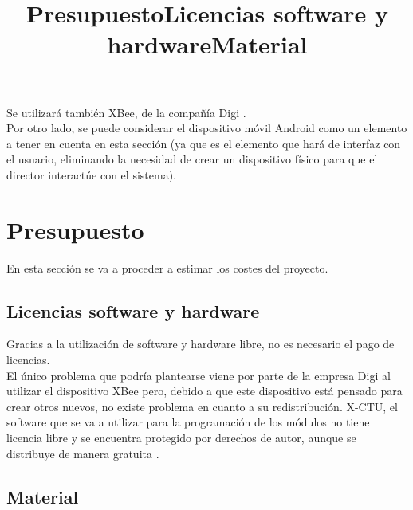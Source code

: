 Se utilizará también XBee, de la compañía Digi \cite{xbeedatasheet}.\\

Por otro lado, se puede considerar el dispositivo móvil Android como un elemento a
tener en cuenta en esta sección (ya que es el elemento que hará de interfaz con el usuario,
eliminando la necesidad de crear un dispositivo físico para que el director interactúe con
el sistema).\\


\section{Presupuesto}
\title{Presupuesto}

En esta sección se va a proceder a estimar los costes del proyecto.\\

\subsection{Licencias software y hardware}
\title{Licencias software y hardware}

Gracias a la utilización de software y hardware libre, no es necesario el pago de licencias.\\

El único problema que podría plantearse viene por parte de la empresa Digi al utilizar
el dispositivo XBee pero, debido a que este dispositivo está pensado para crear otros
nuevos, no existe problema en cuanto a su redistribución. X-CTU, el software que se va a
utilizar para la programación de los módulos no tiene licencia libre y se encuentra protegido
por derechos de autor, aunque se distribuye de manera gratuita \cite{licenciaXCTU}.\\


\subsection{Material}
\title{Material}

